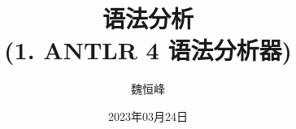 \documentclass[]{beamer}
\title[语法分析]{语法分析 \\ (1. ANTLR 4 语法分析器)}
\author[魏恒峰]{\large 魏恒峰}
\institute{hfwei@nju.edu.cn}
\date{2023年03月24日}
\begin{document}
\maketitle
% 




\thankyou{}

\end{document}
